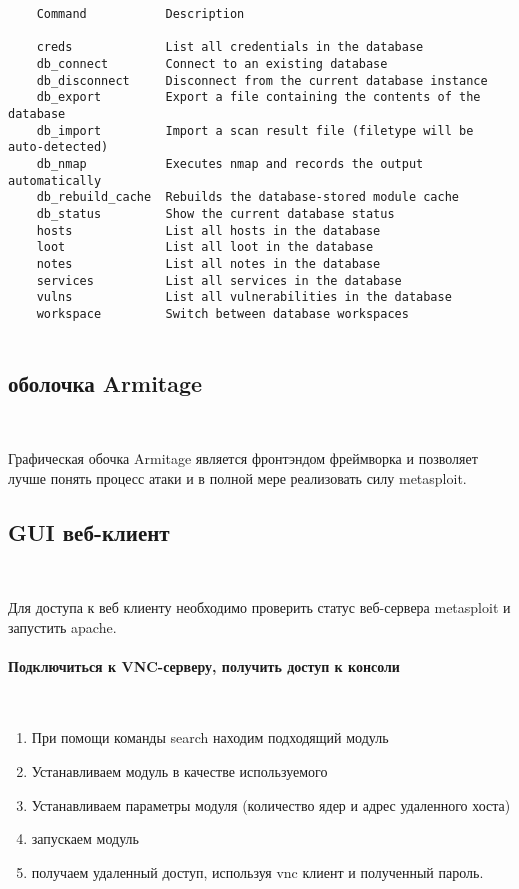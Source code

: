 \documentclass[10pt,a4paper]{article}
\begin{document}
\begin{verbatim}
    Command           Description
   
    creds             List all credentials in the database
    db_connect        Connect to an existing database
    db_disconnect     Disconnect from the current database instance
    db_export         Export a file containing the contents of the database
    db_import         Import a scan result file (filetype will be auto-detected)
    db_nmap           Executes nmap and records the output automatically
    db_rebuild_cache  Rebuilds the database-stored module cache
    db_status         Show the current database status
    hosts             List all hosts in the database
    loot              List all loot in the database
    notes             List all notes in the database
    services          List all services in the database
    vulns             List all vulnerabilities in the database
    workspace         Switch between database workspaces


\end{verbatim}

\subsection{оболочка Armitage}
~

Графическая обочка Armitage является фронтэндом фреймворка и позволяет лучше понять процесс атаки и в полной мере реализовать силу metasploit.

\subsection{GUI веб-клиент}
~

Для доступа к веб клиенту необходимо проверить статус веб-сервера metasploit и запустить apache. 


\paragraph{Подключиться к VNC-серверу, получить доступ к консоли}
~

\begin{enumerate}
\item При помощи команды search находим подходящий модуль
\item Устанавливаем модуль в качестве используемого
\item Устанавливаем параметры модуля (количество ядер и адрес удаленного хоста)
\item запускаем модуль
\item получаем удаленный доступ, используя vnc клиент и полученный пароль.
\end{enumerate}
\end{document}
